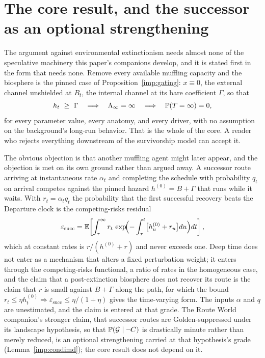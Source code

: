 \section{The core result, and the successor as an optional strengthening}\label{sec:core}

The argument against environmental extinctionism needs almost none of
the speculative machinery this paper's companions develop, and it is
stated first in the form that needs none. Remove every available
muffling capacity and the biosphere is the pinned case of
Proposition~\ref{imp:gating}: $x\equiv0$, the external channel
unshielded at $B_t$, the internal channel at its bare coefficient
$\Gamma$, so that
\[
h_t\ \ge\ \Gamma\quad\Longrightarrow\quad\Lambda_\infty=\infty
\quad\Longrightarrow\quad\PP(T=\infty)=0,
\]
for every parameter value, every anatomy, and every driver, with no
assumption on the background's long-run behavior. That is the whole of
the core. A reader who rejects everything downstream of the survivorship
model can accept it.

The obvious objection is that another muffling agent might later
appear, and the objection is met on its own ground rather than argued
away. A successor route arriving at instantaneous rate $\alpha_t$ and
completing the schedule with probability $q_t$ on arrival competes
against the pinned hazard $h^{(0)}=B+\Gamma$ that runs while it waits.
With $r_t=\alpha_tq_t$ the probability that the first successful
recovery beats the Departure clock is the competing-risks residual
\begin{equation}\label{eq:epssucc}
\varepsilon_{\mathrm{succ}}
=\mathbb{E}\!\left[\int_\tau^\infty r_t\,\exp\!\Bigl(-\int_\tau^t\bigl[h^{(0)}_u+r_u\bigr]du\Bigr)dt\right],
\end{equation}
which at constant rates is $r/(h^{(0)}+r)$ and never exceeds one. Deep
time does not enter as a mechanism that alters a fixed perturbation
weight; it enters through the competing-risks functional, a ratio of
rates in the homogeneous case, and the claim that a post-extinction
biosphere does not recover its route is the claim that $r$ is small
against $B+\Gamma$ along the path, for which the bound
$r_t\le\eta h^{(0)}_t\Rightarrow\varepsilon_{\mathrm{succ}}\le\eta/(1+\eta)$
gives the time-varying form. The inputs $\alpha$ and $q$ are
unestimated, and the claim is entered at that grade. The Route World
companion's stronger claim, that successor routes are Golden-suppressed
under its landscape hypothesis, so that $\mathbb{P}(\mathcal G\mid\neg C)$ is
drastically minute rather than merely reduced, is an optional
strengthening carried at that hypothesis's grade
(Lemma~\ref{imp:condimd}); the core result does not depend on it.

